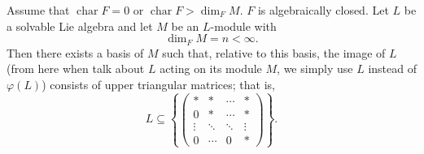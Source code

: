 \begin{theorem}
    Assume that $\operatorname{char} F = 0$ or $\operatorname{char} F > \dim_F M$. $F$ is algebraically closed.
    Let $L$ be a solvable Lie algebra and let $M$ be an $L$-module with
    \[
        \dim_F M = n < \infty.
    \]
    Then there exists a basis of $M$ such that, relative to this basis, the image of $L$ (from here when talk about $L$ acting on its module $M$, we simply use $L$ instead of $\varphi(L)$)
    consists of upper triangular matrices; that is,
    \[
        L \subseteq
        \left\{
        \begin{pmatrix}
            *      & *      & \cdots & *      \\
            0      & *      & \cdots & *      \\
            \vdots & \ddots & \ddots & \vdots \\
            0      & \cdots & 0      & *
        \end{pmatrix}
        \right\}.
    \]
\end{theorem}

